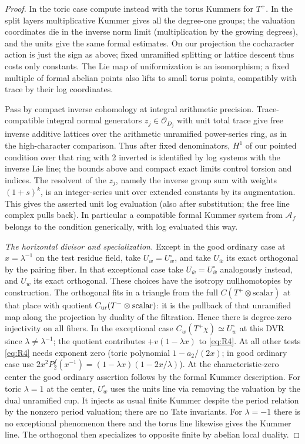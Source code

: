 \begin{proof}
In the toric case compute instead with the torus Kummers for \(T^+\). In the split layers multiplicative Kummer gives all the degree-one groups; the valuation coordinates die in the inverse norm limit (multiplication by the growing degrees), and the units give the same formal estimates. On our projection the cocharacter action is just the sign as above; fixed unramified splitting or lattice descent thus costs only constants. The Lie map of uniformization is an isomorphism; a fixed multiple of formal abelian points also lifts to small torus points, compatibly with trace by their log coordinates.

Pass by compact inverse cohomology at integral arithmetic precision. Trace-compatible integral normal generators \(z_j\in\mathcal O_{D_j}\) with unit total trace give free inverse additive lattices over the arithmetic unramified power-series ring, as in the high-character comparison. Thus after fixed denominators, \(H^1\) of our pointed condition over that ring with 2 inverted is identified by log systems with the inverse Lie line; the bounds above and compact exact limits control torsion and indices. The resolvent of the \(z_j\), namely the inverse group sum with weights \((1+s)^k\), is an integer-series unit over extended constants by its augmentation. This gives the asserted unit log evaluation (also after substitution; the free line complex pulls back). In particular a compatible formal Kummer system from \(\mathcal A_f\) belongs to the condition generically, with log evaluated this way.

\emph{The horizontal divisor and specialization.}
Except in the good ordinary case at \(x=\lambda^{-1}\) on the test residue field, take \(U_w=U_w^\circ\), and take \(U_{\bar w}\) its exact orthogonal by the pairing fiber. In that exceptional case take \(U_{\bar w}=U_{\bar w}^\circ\) analogously instead, and \(U_w\) its exact orthogonal. These choices have the isotropy nullhomotopies by construction. The orthogonal fits in a triangle from the full \(C(T^+\otimes\text{scalar})\) at that place with quotient \(C_{\rm ur}(T^-\otimes\text{scalar})\): it is the pullback of that unramified map along the projection by duality of the filtration. Hence there is degree-zero injectivity on all fibers. In the exceptional case \(C_w(T^+\chi)\simeq U_w^\circ\) at this DVR since \(\lambda\ne\lambda^{-1}\); the quotient contributes \(+v(1-\lambda x)\) to \eqref{eq:R4}. At all other tests \eqref{eq:R4} needs exponent zero (toric polynomial \(1-a_2/(2x)\); in good ordinary case use \(2x^2 P_2^f(x^{-1})=(1-\lambda x)(1-2x/\lambda)\)). At the characteristic-zero center the good ordinary assertion follows by the formal Kummer description. For toric \(\lambda=1\) at the center, \(U_w^\circ\) uses the units line via removing the valuation by the dual unramified cup. It injects as usual finite Kummer despite the period relation by the nonzero period valuation; there are no Tate invariants. For \(\lambda=-1\) there is no exceptional phenomenon there and the torus line likewise gives the Kummer line. The orthogonal then specializes to opposite finite by abelian local duality.


\end{proof}
